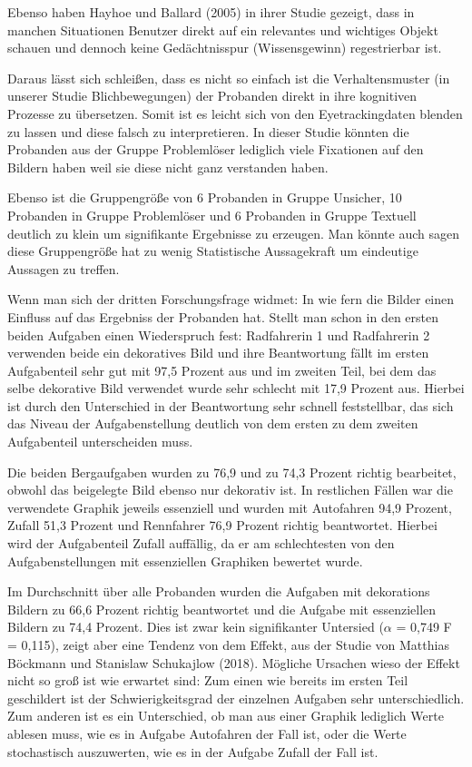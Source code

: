 Ebenso haben Hayhoe und Ballard (2005) in ihrer Studie gezeigt, dass in manchen Situationen Benutzer direkt auf ein relevantes und wichtiges Objekt schauen und dennoch keine Gedächtnisspur (Wissensgewinn) regestrierbar ist\cite{hayhoe2005eye}. 

Daraus lässt sich schleißen, dass es nicht so einfach ist die Verhaltensmuster (in unserer Studie Blichbewegungen) der Probanden direkt in ihre kognitiven Prozesse zu übersetzen. Somit ist es leicht sich von den Eyetrackingdaten blenden zu lassen und diese falsch zu interpretieren. In dieser Studie könnten die Probanden aus der Gruppe Problemlöser lediglich viele Fixationen auf den Bildern haben weil sie diese nicht ganz verstanden haben. 

Ebenso ist die Gruppengröße von 6 Probanden in Gruppe Unsicher, 10 Probanden in Gruppe Problemlöser und 6 Probanden in Gruppe Textuell deutlich zu klein um signifikante Ergebnisse zu erzeugen. Man könnte auch sagen diese Gruppengröße hat zu wenig Statistische Aussagekraft um eindeutige Aussagen zu treffen. 

Wenn man sich der dritten Forschungsfrage widmet: In wie fern die Bilder einen Einfluss auf das Ergebniss der Probanden hat. Stellt man schon in den ersten beiden Aufgaben einen Wiederspruch fest: Radfahrerin 1 und Radfahrerin 2 verwenden beide ein dekoratives Bild und ihre Beantwortung fällt im ersten Aufgabenteil sehr gut mit 97,5 Prozent aus und im zweiten Teil, bei dem das selbe dekorative Bild verwendet wurde sehr schlecht mit 17,9 Prozent aus. Hierbei ist durch den Unterschied in der Beantwortung sehr schnell feststellbar, das sich das Niveau der Aufgabenstellung deutlich von dem ersten zu dem zweiten Aufgabenteil unterscheiden muss.

Die beiden Bergaufgaben wurden zu 76,9 und zu 74,3 Prozent richtig bearbeitet, obwohl das beigelegte Bild ebenso nur dekorativ ist. In restlichen Fällen war die verwendete Graphik jeweils essenziell und wurden mit Autofahren 94,9 Prozent, Zufall 51,3 Prozent und Rennfahrer 76,9 Prozent richtig beantwortet. Hierbei wird der Aufgabenteil Zufall auffällig, da er am schlechtesten von den Aufgabenstellungen mit essenziellen Graphiken bewertet wurde. 

Im Durchschnitt über alle Probanden wurden die Aufgaben mit dekorations Bildern zu 66,6 Prozent richtig beantwortet und die Aufgabe mit essenziellen Bildern zu 74,4 Prozent. Dies ist zwar kein signifikanter Untersied ($\alpha$ = 0,749 F = 0,115), zeigt aber eine Tendenz von dem  Effekt, aus der Studie von Matthias Böckmann und Stanislaw Schukajlow (2018). Mögliche Ursachen wieso der Effekt nicht so groß ist wie erwartet sind: Zum einen wie bereits im ersten Teil geschildert ist der Schwierigkeitsgrad der einzelnen Aufgaben sehr unterschiedlich. Zum anderen ist es ein Unterschied, ob man aus einer Graphik lediglich Werte ablesen muss, wie es in Aufgabe Autofahren der Fall ist, oder die Werte stochastisch auszuwerten, wie es in der Aufgabe Zufall der Fall ist. 

